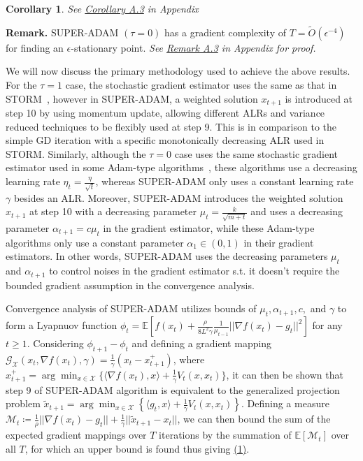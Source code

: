 \documentclass{article}
\newtheorem{corollary}{Corollary}[section]
\begin{document}
\begin{corollary}
	See \hyperref[coro51appendix]{Corollary A.3} in Appendix
\end{corollary}
\textbf{Remark.} SUPER-ADAM $(\tau = 0)$ has a gradient complexity of $T = \tilde{O}(\epsilon^{-4})$ for finding an $\epsilon$-stationary point. \textit{See \hyperref[rmka3]{Remark A.3} in Appendix for proof.}

We will now discuss the primary methodology used to achieve the above results. For the $\tau = 1$ case, the stochastic gradient estimator uses the same as that in STORM~\cite{https://doi.org/10.48550/arxiv.1905.10018}, however in SUPER-ADAM, a weighted solution $x_{t+1}$ is introduced at step 10 by
using momentum update, allowing different ALRs and variance reduced techniques to be flexibly used at step 9. This is in comparison to the simple GD iteration with a specific monotonically decreasing ALR used in STORM. Similarly, although the $\tau = 0$ case uses the
same stochastic gradient estimator used in some Adam-type algorithms~\cite{https://doi.org/10.48550/arxiv.1412.6980, https://doi.org/10.48550/arxiv.1904.09237, https://doi.org/10.48550/arxiv.2010.07468}, these algorithms use a decreasing learning rate
$\eta_t = \frac{\eta}{\sqrt{t}}$, whereas SUPER-ADAM only uses a constant learning rate $\gamma$ besides an ALR. Moreover, SUPER-ADAM introduces the weighted solution $x_{t+1}$ at step 10 with a decreasing
parameter $\mu_t = \frac{k}{\sqrt{m+t}}$ and uses a decreasing parameter $\alpha_{t+1} = c\mu_t$ in the gradient estimator, while these Adam-type algorithms only use a constant parameter $\alpha_1\in (0,1)$ in their gradient estimators. In other words, SUPER-ADAM uses the
decreasing parameters $\mu_t$ and $\alpha_{t+1}$ to control noises in the gradient estimator s.t. it doesn't require the bounded gradient assumption in the convergence analysis.

Convergence analysis of SUPER-ADAM utilizes bounds of $\mu_t, \alpha_{t+1}, c,$ and $\gamma$ to form a Lyapnuov function $\phi_t = \mathbb{E}[f(x_t) + \frac{\rho}{8L^2 \gamma}\frac{1}{\mu_{t-1}}||\nabla f(x_t) - g_t||^2]$ for any $t\geq 1$. Considering
$\phi_{t+1} - \phi_t$ and defining a gradient mapping $\mathcal{G}_{\mathcal{X}}(x_t, \nabla f(x_t),\gamma) = \frac{1}{\gamma}(x_t - x^+_{t+1})$, where $x^+_{t+1} = \arg\min_{x\in\mathcal{X}}\{\langle\nabla f(x_t), x\rangle + \frac{1}{\gamma} V_t(x,x_t)\}$,
it can then be shown that step 9 of SUPER-ADAM algorithm is equivalent to the generalized projection problem $\tilde{x}_{t+1} = \arg\min_{x\in\mathcal{X}}\left\{\langle g_t, x\rangle + \frac{1}{\gamma}V_t (x,x_t)\right\}$.
Defining a measure $\mathcal{M}_t\coloneqq\frac{1}{\rho}||\nabla f(x_t) - g_t|| + \frac{1}{\gamma}||\tilde{x}_{t+1} - x_t||$,
we can then bound the sum of the expected gradient mappings over $T$ iterations by the summation of $\mathbb{E}[\mathcal{M}_t]$ over all $T$, for which an upper bound is found thus giving \hyperref[eq61]{(1)}.
\end{document}
